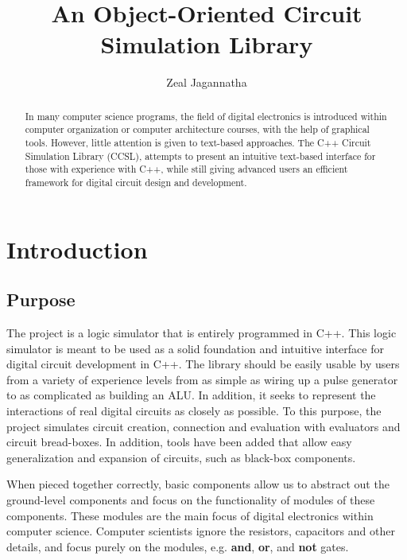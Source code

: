 \documentclass{article}
\newcommand{\Bold}[1]{\textbf{#1}}
\begin{document}
\title{An Object-Oriented Circuit Simulation Library}
\author{Zeal Jagannatha}

\maketitle

\begin{abstract}

In many computer science programs, the field of digital electronics is introduced within computer organization or computer architecture courses, with the help of graphical tools. However, little attention is given to text-based approaches. The C++ Circuit Simulation Library (CCSL), attempts to present an intuitive text-based interface for those with experience with C++, while still giving advanced users an efficient framework for digital circuit design and development.

\end{abstract}

\section{Introduction}

\subsection{Purpose}

The project is a logic simulator that is entirely programmed in C++. This logic simulator is meant to be used as a solid foundation and intuitive interface for digital circuit development in C++. The library should be easily usable by users from a variety of experience levels from as simple as wiring up a pulse generator to as complicated as building an ALU. In addition, it seeks to represent the interactions of real digital circuits as closely as possible. To this purpose, the project simulates circuit creation, connection and evaluation with evaluators and circuit bread-boxes. In addition, tools have been added that allow easy generalization and expansion of circuits, such as black-box components.

When pieced together correctly, basic components allow us to abstract out the ground-level components and focus on the functionality of modules of these components. These modules are the main focus of digital electronics within computer science. Computer scientists ignore the resistors, capacitors and other details, and focus purely on the modules, e.g. \Bold{and}, \Bold{or}, and \Bold{not} gates.
\end{document}
